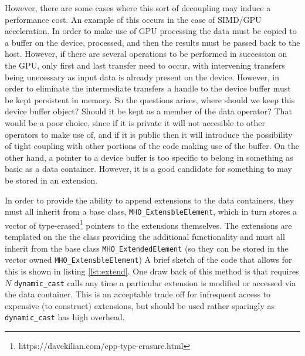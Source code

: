 However, there are some cases where this sort of decoupling may induce a performance cost. An example of
this occurs in the case of SIMD/GPU acceleration. In order to make use of GPU processing the data must be copied to a buffer on the device, processed, and then the results must be passed back to the host. However, if there are several operations to be performed in succession on the GPU, only first and last transfer need to occur, with intervening transfers being unecessary as input data is already present on the device. However, in order to eliminate the intermediate transfers a handle to the device buffer must be kept persistent in memory. So the questions arises, where should we keep this device buffer object? Should it be kept as a member of the data operator? That would be a poor choice, since if it is private it will not accesible to other operators to make use of, and if it is public then it will introduce the possibility of tight coupling with other portions of the code making use of the buffer. On the other hand, a pointer to a device buffer is too specific to belong in something as basic as a data container. However, it is a good candidate for something to may be stored in an extension.

In order to provide the ability to append extensions to the data containers, they must all inherit from a base class, \texttt{MHO\_ExtensbleElement}, which
in turn stores a vector of type-erased\footnote{https://davekilian.com/cpp-type-erasure.html} pointers to the extensions themselves. The extensions are templated on the the class providing the additional functionality and must all inherit from the base class \texttt{MHO\_ExtendedElement} (so they can be stored in the vector owned \texttt{MHO\_ExtensbleElement}) A brief sketch of the code that allows for this is shown in listing \ref{lst:extend}. One draw back of this method is that requires $N$ \texttt{dynamic\_cast} calls any time a particular extension is modified or accessed via the data container. 
This is an acceptable trade off for infrequent access to expensive (to construct) extensions, but should be used rather sparingly as \texttt{dynamic\_cast} has high overhead.


